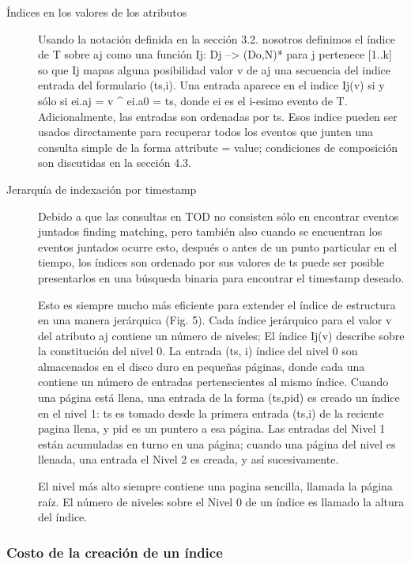 \documentclass[12pt,a4paper]{report}
\begin{document}
\begin{description}
	\item[Índices en los valores de los atributos] Usando la notación definida en la sección 3.2.  nosotros definimos el índice de T sobre aj como una función Ij: Dj --> (Do,N)* para j pertenece [1..k] so que Ij mapas alguna posibilidad valor v de aj una secuencia del indice entrada del formulario (ts,i).  Una entrada aparece en el indice Ij(v) si y sólo si ei.aj = v ^ ei.a0 = ts, donde ei es el i-esimo evento de T.  Adicionalmente, las entradas son ordenadas por ts.  Esos indice pueden ser usados directamente para recuperar todos los eventos que junten una consulta simple de la forma attribute = value; condiciones de composición son discutidas en la sección 4.3.

	\item[Jerarquía de indexación por timestamp] Debido a que las consultas en TOD no consisten sólo en encontrar eventos juntados {finding matching}, pero también {also} cuando se encuentran los eventos juntados ocurre esto, después o antes de un punto particular en el tiempo, los índices son ordenado por sus valores de ts puede ser posible presentarlos en una búsqueda binaria para encontrar el timestamp deseado.

Esto es siempre mucho más eficiente para extender el índice de estructura en una manera jerárquica (Fig. 5).  Cada índice jerárquico para el valor v del atributo aj contiene un número de niveles;  El índice Ij(v) describe sobre la constitución del nivel 0.  La entrada (ts, i) índice del nivel 0 son almacenados en el disco duro en pequeñas páginas, donde cada una contiene un número de entradas pertenecientes al mismo índice.  Cuando una página está llena, una entrada de la forma (ts,pid) es creado un índice en el nivel 1: ts es tomado desde la primera entrada (ts,i) de la reciente pagina llena, y pid es un puntero a esa página.  Las entradas del Nivel 1 están acumuladas en turno en una página; cuando una página del nivel es llenada, una entrada el Nivel 2 es creada, y así sucesivamente.  

El nivel más alto siempre contiene una pagina sencilla, llamada la página raíz.  El número de niveles sobre el Nivel 0 de un índice es llamado la altura del índice.  
\end{description}


			\subsubsection{Costo de la creación de un índice}
\end{document}
